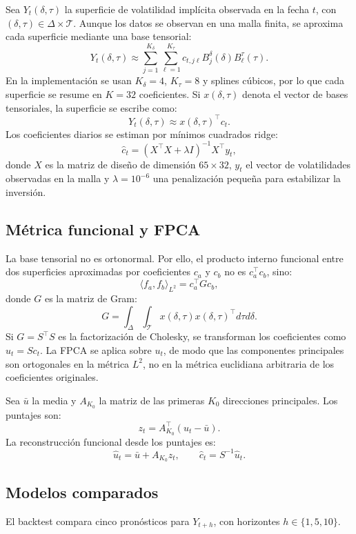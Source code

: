 \documentclass[12pt,a4paper]{article}
\newcommand{\SVI}{superficie de volatilidad implícita}
\begin{document}
Sea \(Y_t(\delta,\tau)\) la \SVI{} observada en la fecha \(t\), con \((\delta,\tau)\in \Delta\times\mathcal{T}\). Aunque los datos se observan en una malla finita, se aproxima cada superficie mediante una base tensorial:
\[
  Y_t(\delta,\tau) \approx \sum_{j=1}^{K_\delta}\sum_{\ell=1}^{K_\tau}
  c_{t,j\ell} B_j^\delta(\delta) B_\ell^\tau(\tau).
\]
En la implementación se usan \(K_\delta=4\), \(K_\tau=8\) y splines cúbicos, por lo que cada superficie se resume en \(K=32\) coeficientes. Si \(x(\delta,\tau)\) denota el vector de bases tensoriales, la superficie se escribe como:
\[
  Y_t(\delta,\tau) \approx x(\delta,\tau)^\top c_t.
\]
Los coeficientes diarios se estiman por mínimos cuadrados ridge:
\[
  \widehat c_t =
  (X^\top X+\lambda I)^{-1}X^\top y_t,
\]
donde \(X\) es la matriz de diseño de dimensión \(65\times 32\), \(y_t\) el vector de volatilidades observadas en la malla y \(\lambda=10^{-6}\) una penalización pequeña para estabilizar la inversión.

\subsection{Métrica funcional y FPCA}

La base tensorial no es ortonormal. Por ello, el producto interno funcional entre dos superficies aproximadas por coeficientes \(c_a\) y \(c_b\) no es \(c_a^\top c_b\), sino:
\[
  \langle f_a,f_b\rangle_{L^2} = c_a^\top G c_b,
\]
donde \(G\) es la matriz de Gram:
\[
  G = \int_{\Delta}\int_{\mathcal{T}} x(\delta,\tau)x(\delta,\tau)^\top d\tau d\delta.
\]
Si \(G=S^\top S\) es la factorización de Cholesky, se transforman los coeficientes como \(u_t=S c_t\). La FPCA se aplica sobre \(u_t\), de modo que las componentes principales son ortogonales en la métrica \(L^2\), no en la métrica euclidiana arbitraria de los coeficientes originales.

Sea \(\bar u\) la media y \(A_{K_0}\) la matriz de las primeras \(K_0\) direcciones principales. Los puntajes son:
\[
  z_t = A_{K_0}^\top (u_t-\bar u).
\]
La reconstrucción funcional desde los puntajes es:
\[
  \widehat u_t = \bar u + A_{K_0}z_t,\qquad
  \widehat c_t = S^{-1}\widehat u_t.
\]

\subsection{Modelos comparados}

El backtest compara cinco pronósticos para \(Y_{t+h}\), con horizontes \(h\in\{1,5,10\}\).
\end{document}
